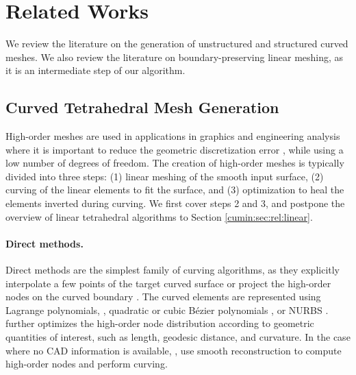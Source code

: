 \section{Related Works}\label{cumin:sec:related}

We review the literature on the generation of unstructured and structured curved meshes. We also review the literature on boundary-preserving linear meshing, as it is an intermediate step of our algorithm.

\subsection{Curved Tetrahedral Mesh Generation}

High-order meshes are used in applications in graphics \cite{bargteil2014animation,MEZGER2009680,Suwelack2013} and engineering analysis \cite{Jameson2002} where it is important to reduce the geometric discretization error \cite{Babuska1988,BABUSKA1992159,BASSI1997251,luo2001influence,ODEN1994309}, while using a low number of degrees of freedom. The creation of high-order meshes is typically divided into three steps: (1) linear meshing of the smooth input surface, (2) curving of the linear elements to fit the surface, and (3) optimization to heal the elements inverted during curving. We first cover steps 2 and 3, and postpone the overview of linear tetrahedral algorithms to Section \ref{cumin:sec:rel:linear}.

\paragraph{Direct methods.} Direct methods are the simplest family of curving algorithms, as they explicitly interpolate a few points of the target curved surface or project the high-order nodes on the curved boundary  \cite{dey1999curvilinear,Ghasemi2016,MOXEY2015636,abgrall2012,sherwin2002mesh,turner2017high,marcon2019semi}. The curved elements are represented using Lagrange polynomials, \cite{dey1999curvilinear,Peir2008}, quadratic or cubic B{\'e}zier polynomials \cite{George2012,Qiukai2013,Luo2002pVersionMG}, or NURBS \cite{ENGVALL2016378,ENGVALL201783}. \cite{SHEPHARD2005251,sherwin2002mesh} further optimizes the high-order node distribution according to geometric quantities of interest, such as length, geodesic distance, and curvature. 
In the case where no CAD information is available, \cite{wang2016construction}, \cite{jiao2012reconstructing} use smooth reconstruction to compute high-order nodes and perform curving.

